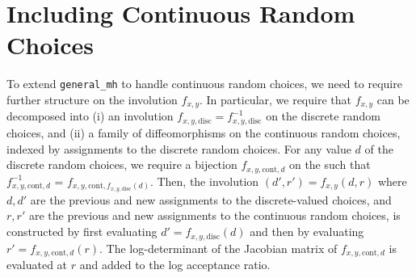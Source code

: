 \documentclass{article}
\begin{document}
\section{Including Continuous Random Choices}
To extend \texttt{general\_mh} to handle continuous random choices, we need to require further structure on the involution $f_{x,y}$.
In particular, we require that $f_{x,y}$ can be decomposed into (i) an involution $f_{x,y,\mathrm{disc}} = f_{x,y,\mathrm{disc}}^{-1}$ on the discrete random choices, and (ii) a family of diffeomorphisms on the continuous random choices, indexed by assignments to the discrete random choices.
For any value $d$ of the discrete random choices, we require a bijection $f_{x,y,\mathrm{cont},d}$ on the such that $f^{-1}_{x,y,\mathrm{cont},d}$ = $f_{x,y,\mathrm{cont},f_{x,y,\mathrm{disc}}(d)}$.
Then, the involution $(d', r') = f_{x,y}(d, r)$ where $d, d'$ are the previous and new assignments to the discrete-valued choices, and $r, r'$ are the previous and new assignments to the continuous random choices, is constructed by first evaluating $d' = f_{x,y,\mathrm{disc}}(d)$ and then by evaluating $r' = f_{x,y,\mathrm{cont},d}(r)$.
The log-determinant of the Jacobian matrix of $f_{x,y,\mathrm{cont},d}$ is evaluated at $r$ and added to the log acceptance ratio.
\end{document}
